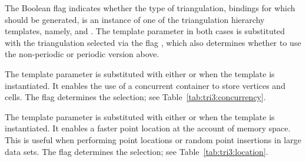 The \cmake{} Boolean flag  indicates whether the type of triangulation, bindings for which should be generated, is an instance of one of the triangulation hierarchy templates, namely,  and
. The template parameter in both cases is substituted with the triangulation selected via the \cmake{} flag
, which also determines whether to use the non-periodic or periodic version above.

The template parameter  is substituted with either  or  when the template  is instantiated. It enables the use of a concurrent container to store vertices and cells. The \cmake{} flag  determines the selection; see Table~\ref{tab:tri3:concurrency}.

\begin{table}[!htp]
  \caption{3D triangulation concurrency options}
  \centering{}
  \label{tab:tri3:concurrency}
\end{table}

The template parameter  is substituted with either  or  when the template
 is instantiated. It enables a faster point location at the account of memory space. This is useful when performing point locations or random point insertions in large data sets.  The \cmake{} flag  determines the selection; see Table~\ref{tab:tri3:location}.

\begin{table}[!htp]
  \caption{3D triangulation location policy options}
  \centering{}
  \label{tab:tri3:location}
\end{table}

